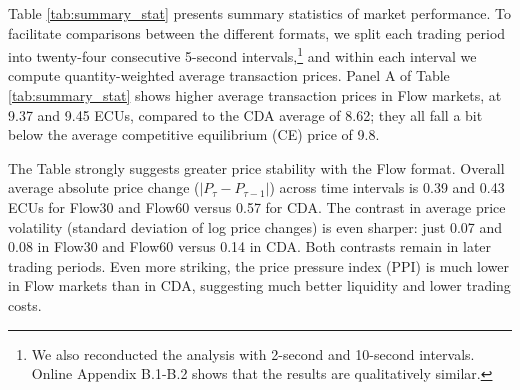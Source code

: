 \documentclass[12pt]{article}
\begin{document}
Table \ref{tab:summary_stat} presents summary statistics of market performance. To facilitate comparisons between the different formats, we split each trading period into twenty-four consecutive 5-second intervals,\footnote{We also reconducted the analysis with 2-second and 10-second intervals. Online Appendix B.1-B.2 shows that the results are qualitatively similar.}
and within each interval we compute quantity-weighted average transaction prices.  %
Panel A of Table \ref{tab:summary_stat} %
shows higher average transaction prices in Flow markets, at 9.37 and 9.45 ECUs, compared to the CDA average of 8.62; they all fall a bit below the average competitive equilibrium (CE) price of 9.8. 

The Table strongly suggests greater price stability with the Flow format. 
Overall average absolute price change (\(|P_\tau - P_{\tau-1}|\)) across time intervals is 0.39 and 0.43 ECUs for Flow30 and Flow60 versus 0.57 for CDA. 
The contrast in average price volatility (standard deviation of log price changes) is even sharper:
just 0.07 and 0.08 in Flow30 and Flow60 versus 0.14 in CDA.
Both contrasts remain in later trading periods. %
Even more striking, the price pressure index (PPI) is much lower in Flow markets than in CDA, suggesting much better liquidity and lower trading costs. 
\end{document}
